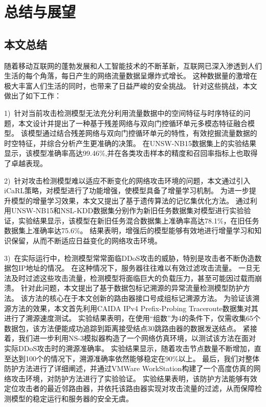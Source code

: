 \chapter{总结与展望}
\label{cha:over_view}

\section{本文总结}


随着移动互联网的蓬勃发展和人工智能技术的不断革新，互联网已深入渗透到人们生活的每个角落，每日产生的网络流量数据呈爆炸式增长。
这种数据量的激增在极大丰富人们生活的同时，也带来了日益严峻的安全挑战。
针对这些挑战，本文做出了如下工作：\par
1)~针对当前攻击检测模型无法充分利用流量数据中的空间特征与时序特征的问题，本文设计并提出了一种基于残差网络与双向门控循环单元多模态特征融合模型。
该模型通过结合残差网络与双向门控循环单元的特性，有效挖掘流量数据的时空特征，并综合分析产生更准确的决策。
在UNSW-NB15数据集上的实验结果显示，该模型准确率高达99.46\%,并在各类攻击样本的精度和召回率指标上也取得了卓越表现。\par

2)~针对攻击检测模型难以适应不断变化的网络攻击环境的问题，本文通过引入iCaRL策略，对模型进行了功能增强，使模型具备了增量学习机制。
为进一步提升模型的增量学习效果，本文又提出了基于遗传算法的记忆集优化方法。
通过利用UNSW-NB15和NSL-KDD数据集分别作为新旧任务数据集对模型进行实验验证，实验结果显示，该模型在新旧任务混合数据集上准确率高达78.1\%，在旧任务数据集上准确率达75.6\%。
结果表明，增强后的模型能够有效地进行增量学习和知识保留，从而不断适应日益变化的网络攻击环境。\par


3)~在实际运行中，检测模型常常面临DDoS攻击的威胁，特别是攻击者不断伪造数据包IP地址的情况。
在这种情况下，服务器往往难以有效过滤攻击流量。
一旦无法及时过滤这些攻击流量，检测模型将面临巨大的负载压力，甚至可能因过载而崩溃。
针对此问题，本文提出了基于数据包标记溯源的异常流量检测模型防护方法。
该方法的核心在于本文创新的路由器接口号成组标记溯源方法。
为验证该溯源方法的效果，本文首先利用CAIDA IPv4 Prefix-Probing Traceroute数据集对其进行了溯源速度测试。
实验结果表明，在使用“组数”为4的条件下，仅需收集65个数据包，该方法便能成功追踪到距离接受结点30跳路由器的数据发送结点。
紧接着，我们进一步利用NS-3模拟器构造了一个网络仿真环境，以测试该方法在面对实际DDoS攻击时的溯源准确率。
实验结果显示，随着攻击节点数量不断增加，直至达到100个的情况下，溯源准确率依然能够稳定在90\%以上。
最后，我们对整体防护方法进行了详细阐述，并通过VMWare WorkStation构建了一个高度仿真的网络攻击环境，对防护方法进行了实验验证。
实验结果表明，该防护方法能够有效定位攻击者的最近邻路由器，并依托该路由器实现对攻击流量的过滤，从而保障检测模型的稳定运行和服务器的安全无虞。

